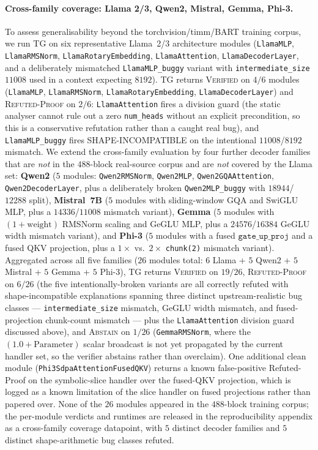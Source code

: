 \paragraph{Cross-family coverage: Llama 2/3, Qwen2, Mistral, Gemma, Phi-3.}
To assess generalisability beyond the torchvision/timm/BART
training corpus, we run \textsc{TG} on six representative Llama~2/3
architecture modules
(\texttt{LlamaMLP}, \texttt{LlamaRMSNorm}, \texttt{LlamaRotaryEmbedding},
\texttt{LlamaAttention}, \texttt{LlamaDecoderLayer}, and a deliberately
mismatched \texttt{LlamaMLP\_buggy} variant with \texttt{intermediate\_size}
$11008$ used in a context expecting $8192$).
\textsc{TG} returns \textsc{Verified} on $4/6$ modules
(\texttt{LlamaMLP}, \texttt{LlamaRMSNorm}, \texttt{LlamaRotaryEmbedding},
\texttt{LlamaDecoderLayer}) and \textsc{Refuted-Proof} on $2/6$:
\texttt{LlamaAttention} fires a division guard (the static
analyser cannot rule out a zero \texttt{num\_heads} without an explicit
precondition, so this is a conservative refutation rather than a
caught real bug), and \texttt{LlamaMLP\_buggy} fires
\textsc{SHAPE-INCOMPATIBLE} on the intentional $11008$/$8192$ mismatch.
We extend the cross-family evaluation by four further decoder
families that are \emph{not} in the $488$-block real-source corpus
and are \emph{not} covered by the Llama set:
\textbf{Qwen2} ($5$ modules: \texttt{Qwen2RMSNorm},
\texttt{Qwen2MLP}, \texttt{Qwen2GQAAttention},
\texttt{Qwen2DecoderLayer}, plus a deliberately broken
\texttt{Qwen2MLP\_buggy} with $18944$/$12288$ split),
\textbf{Mistral~7B} ($5$ modules with sliding-window GQA and
SwiGLU MLP, plus a $14336$/$11008$ mismatch variant),
\textbf{Gemma} ($5$ modules with $(1{+}\text{weight})$ RMSNorm
scaling and GeGLU MLP, plus a $24576$/$16384$ GeGLU width
mismatch variant), and \textbf{Phi-3} ($5$ modules with a fused
$\texttt{gate\_up\_proj}$ and a fused QKV projection, plus a
$1\!\times$ vs.\ $2\!\times$ \texttt{chunk(2)} mismatch variant).
Aggregated across all five families ($26$ modules total: $6$
Llama + $5$ Qwen2 + $5$ Mistral + $5$ Gemma + $5$ Phi-3),
\textsc{TG} returns \textsc{Verified} on $19/26$, \textsc{Refuted-Proof}
on $6/26$ (the five intentionally-broken variants are all
correctly refuted with shape-incompatible explanations spanning
three distinct upstream-realistic bug classes ---
\texttt{intermediate\_size} mismatch, GeGLU width mismatch, and
fused-projection chunk-count mismatch --- plus the
\texttt{LlamaAttention} division guard discussed above), and
\textsc{Abstain} on $1/26$ (\texttt{GemmaRMSNorm}, where the
$(1.0 + \mathrm{Parameter})$ scalar broadcast is not yet
propagated by the current handler set, so the verifier abstains
rather than overclaim). One additional clean module
(\texttt{Phi3SdpaAttentionFusedQKV}) returns a known
false-positive Refuted-Proof on the symbolic-slice handler over
the fused-QKV projection, which is logged as a known limitation
of the slice handler on fused projections rather than papered
over. None of the $26$ modules appeared in the $488$-block
training corpus; the per-module verdicts and runtimes are
released in the reproducibility appendix as a cross-family
coverage datapoint, with $5$ distinct decoder families and $5$
distinct shape-arithmetic bug classes refuted.

